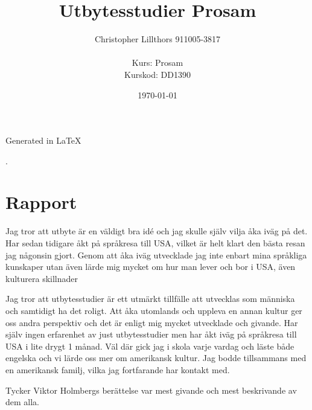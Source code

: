 \documentclass[a4paper,11pt,twoside]{article}
\title{Utbytesstudier Prosam}
\author{
  Christopher Lillthors 911005-3817 \\
  \\
  Kurs: Prosam \\
  Kurskod: DD1390
}
\date{\today}
\begin{document}
\maketitle
\tableofcontents
\begin{frame}
\null
\vfill
Generated in \LaTeX
\end{frame}
\thispagestyle{empty}.
\newpage
\clearpage
\setcounter{page}{1}






\section{Rapport}
Jag tror att utbyte är en väldigt bra idé och jag skulle själv vilja åka iväg på det. Har sedan tidigare åkt på språkresa till USA, vilket är helt klart den bästa resan jag någonsin gjort. Genom att åka iväg utvecklade jag inte enbart mina språkliga kunskaper utan även lärde mig mycket om hur man lever och bor i USA, även kulturera skillnader


Jag tror att utbytesstudier är ett utmärkt tillfälle att utvecklas som människa och samtidigt ha det roligt. Att åka utomlands och uppleva en annan kultur ger oss andra perspektiv och det är enligt mig mycket utvecklade och givande.
Har själv ingen erfarenhet av just utbytesstudier men har åkt iväg på språkresa till USA i lite drygt 1 månad. Väl där gick jag i skola varje vardag och läste både engelska och vi lärde oss mer om amerikansk kultur. Jag bodde tillsammans med en amerikansk familj, vilka jag fortfarande har kontakt med.

Tycker Viktor Holmbergs berättelse var mest givande och mest beskrivande av dem alla.
\end{document}
